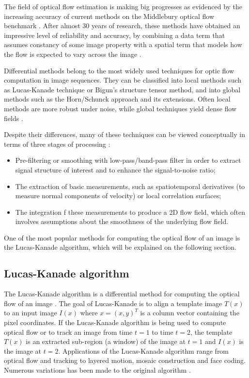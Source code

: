 \documentclass[msc, a4paper, classic, en]{ufbathesis}
\begin{document}
The field of optical flow estimation is making big progresses as evidenced by the increasing accuracy of current methods on the Middlebury optical flow benchmark \cite{Scharstein:2002:TED:598429.598475}. After almost 30 years of research, these methods have obtained an impressive level of reliability and accuracy, by combining a data term that assumes constancy of some image property with a spatial term that models how the flow is expected to vary across the image \cite{opticalflow14}.

Differential methods belong to the most widely used techniques for optic flow computation in image sequences. They can be classified into local methods such as Lucas-Kanade technique or Bigun's structure tensor method, and into global methods such as the Horn/Schunck approach and its extensions. Often local methods are more robust under noise, while global techniques yield dense flow fields \cite{lkhs}.

Despite their differences, many of these techniques can be viewed conceptually in terms of three stages of processing \cite{opticalflow}:

\begin{itemize}
  \item Pre-filtering or smoothing with low-pass/band-pass filter in order to extract signal structure of interest and to enhance the signal-to-noise ratio;
  \item The extraction of basic measurements, such as spatiotemporal derivatives (to measure normal components of velocity) or local correlation surfaces;
  \item The integration f these measurements to produce a 2D flow field, which often involves assumptions about the smoothness of the underlying flow field.
\end{itemize}

One of the most popular methods for computing the optical flow of an image is the Lucas-Kanade algorithm, which will be explained on the following section.

\subsection{Lucas-Kanade algorithm}

The Lucas-Kanade \cite{lk} algorithm is a differential method for computing the optical flow of an image \cite{kinectkanade}. The goal of Lucas-Kanade is to align a template image $T(x)$ to an input image $I(x)$ where $x = (x, y)^T$ is a column vector containing the pixel coordinates. If the Lucas-Kanade algorithm is being used to compute optical flow or to track an image from time $t = 1$ to time $t = 2$, the template $T(x)$ is an extracted sub-region (a window) of the image at $t = 1$ and $I(x)$ is the image at $t = 2$. Applications of the Lucas-Kanade algorithm range from optical flow and tracking to layered motion, mosaic construction and face coding. Numerous variations has been made to the original algorithm \cite{lk20}.
\end{document}
